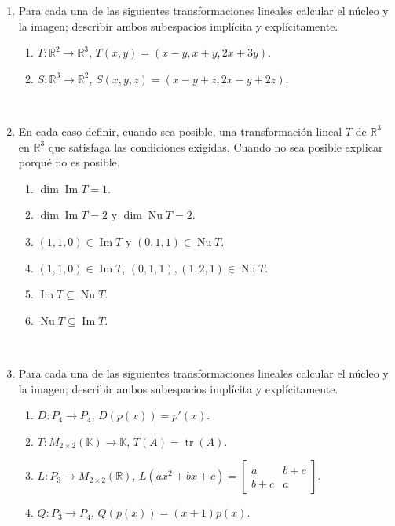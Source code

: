 \documentclass[11pt,spanish,makeidx]{amsbook}
\newcommand\im{\operatorname{Im}}
\renewcommand\nu{\operatorname{Nu}}
\newcommand\R{\mathbb{R}}
\newcommand\tr{\operatorname{tr}}
\begin{document}
\begin{enumerate}
	\
	
	\item \label{lineales1} Para cada una de las siguientes transformaciones lineales calcular el n\'ucleo y la imagen;
	describir ambos subespacios impl\'icita y expl\'icitamente.
	\begin{enumerate}
		\item $T:\R^2 \longrightarrow \R^3$, $T(x,y)=(x-y,x+y,2x+3y)$.
		\item $S:\R^3 \longrightarrow \R^2$, $S(x,y,z)=(x-y+z,2x-y+2z)$.
	\end{enumerate}
		
	\
		
	\item En cada caso definir, cuando sea posible, una transformaci\'on lineal $T$ de $\R^3$
	en $\R^3$ que satisfaga las condiciones exigidas.
	Cuando no sea posible explicar porqu\'e no es posible.
	\begin{enumerate}
		\item $\dim \im T=1$.
		\item $\dim \im T=2$ y $\dim \nu T=2$.
		\item $(1,1,0)\in \im T$ y $(0,1,1)\in \nu T$.
		\item $(1,1,0)\in \im T$, $(0,1,1), (1,2,1)\in \nu T$.
		\item $\im T \subseteq \nu T$.
		\item $\nu T \subseteq \im T$.
	\end{enumerate}
		
	\
	
	\item \label{lineales2} Para cada una de las siguientes transformaciones lineales calcular el n\'ucleo y la imagen;
	describir ambos subespacios impl\'icita y expl\'icitamente.
	\begin{enumerate}
		\item $D:P_4  \longrightarrow P_4$, $D(p(x))=p'(x)$.
		\item $T:M_{2\times 2}(\mathbb{K}) \longrightarrow \mathbb{K}$, $T(A)=\tr (A)$.
		\item $L:P_3 \longrightarrow M_{2\times 2}(\R)$, $L(ax^2+bx+c)=\begin{bmatrix} a & b+c \\ b+c & a \end{bmatrix}$.
		\item $Q:P_3 \longrightarrow P_4$, $Q(p(x))=(x+1)p(x)$.
	\end{enumerate}
		
	\	
	

\end{enumerate}
\end{document}
